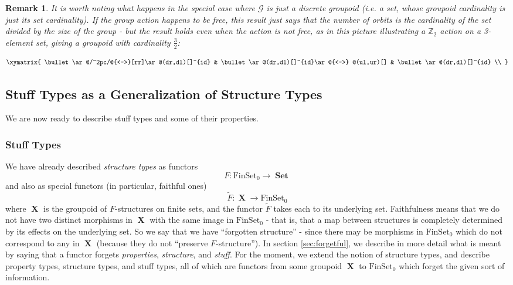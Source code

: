 \documentclass{amsart} \usepackage{amsmath,amssymb,bbm}
\newcommand{\opname}[1]{\operatorname{#1}}
\newcommand{\catname}[1]{\boldsymbol{\opname{{#1}}}}
\newcommand{\FSN}{\catname{FinSet_0}}
\newcommand{\Set}{\catname{Set}}
\newtheorem{varremark}{Remark}
\newenvironment{remark}{\begin{varremark}\em}{\em\end{varremark}}
\begin{document}
\begin{remark} It is worth noting what happens in the special case
where $\mathcal{G}$ is just a discrete groupoid (i.e. a set, whose
groupoid cardinality is just its set cardinality).  If the group
action happens to be free, this result just says that the number of
orbits is the cardinality of the set divided by the size of the group
- but the result holds even when the action is not free, as in
this picture illustrating a $\mathbb{Z}_2$ action on a 3-element set,
giving a groupoid with cardinality $\frac{3}{2}$:

\vspace{0.2in}

\begin{equation}
 \xymatrix{
  \bullet\ar@/^2pc/@{<->}[rr]\ar@(dr,dl)[]^{id} & \bullet\ar@(dr,dl)[]^{id}\ar@{<->}
@(ul,ur)[] & \bullet\ar@(dr,dl)[]^{id} \\
 }
\end{equation}
\end{remark}

\subsection{Stuff Types as a Generalization of Structure Types}

We are now ready to describe stuff types and some of their properties.

\subsubsection{Stuff Types}\label{stufftypes}

We have already described \textit{structure types} as functors
\[ F : \FSN \rightarrow \Set \]
and also as special functors (in particular, faithful ones)
\[ \tilde{F} : \catname{X} \rightarrow \FSN \]
where $\catname{X}$ is the groupoid of $F$-structures on finite sets, and the functor
$\tilde{F}$ takes each to its underlying set. Faithfulness means that we do
not have two distinct morphisms in $\catname{X}$ with the same image in
$\FSN$ - that is, that a map between structures is
completely determined by its effects on the underlying set.  So we say that we
have ``forgotten structure'' - since there may be morphisms in
$\FSN$ which do not correspond to any in $\catname{X}$ (because
they do not ``preserve $F$-structure'').  In section \ref{sec:forgetful}, we
describe in more detail what is meant by saying that a functor forgets
\textit{properties}, \textit{structure}, and \textit{stuff}.  For the moment,
we extend the notion of structure types, and describe property types,
structure types, and stuff types, all of which are functors from some groupoid
$\catname{X}$ to $\FSN$ which forget the given sort of
information.
\end{document}
